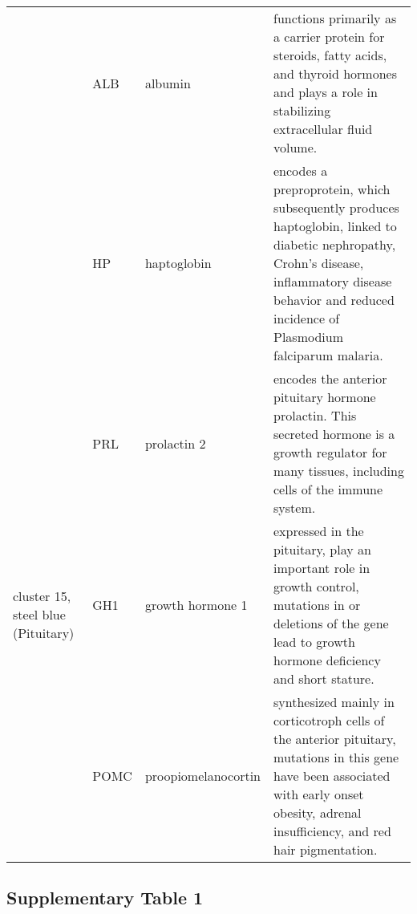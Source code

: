 \begin{table}
\begin{center}
\begin{tabular}{|p{0.7in} |p{0.5in}|p{1.4in}|p{3.6in}|}
 					      &  \small{ALB} & \footnotesize{albumin} & \scriptsize{functions primarily as a carrier protein for steroids, fatty acids, and thyroid hormones and plays a role in stabilizing extracellular fluid volume.} \\
					      &  \small{HP} & \footnotesize{haptoglobin} & \scriptsize{encodes a preproprotein, which subsequently  produces haptoglobin, linked to diabetic nephropathy, Crohn's disease, inflammatory disease behavior and reduced incidence of Plasmodium falciparum malaria.}\\
\hline					      
 \multirow{3}{4em}{\small{cluster 15, steel blue (Pituitary)}}&  \small{PRL} & \footnotesize{prolactin 2} & \scriptsize{encodes the anterior pituitary hormone prolactin. This secreted hormone is a growth regulator for many tissues, including cells of the immune system.} \\
 					      &  \small{GH1} & \footnotesize{growth hormone 1} & \scriptsize{expressed in the pituitary, play an important role in growth control, mutations in or deletions of the gene lead to growth hormone deficiency and short stature.}\\
					      &  \small{POMC} & \footnotesize{proopiomelanocortin} & \scriptsize{synthesized mainly in corticotroph cells of the anterior pituitary, mutations in this gene have been associated with early onset obesity, adrenal insufficiency, and red hair pigmentation.} \\
\hline
 \end{tabular}
 \end{center}
\end{table}

\clearpage

\subsection{Supplementary Table 1}

